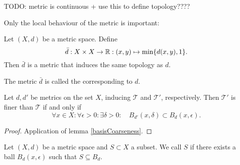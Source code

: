 TODO: metric is continuous + use this to define topology????


Only the local behaviour of the metric is important:
\begin{proposition}
Let $(X,d)$ be a metric space. Define
\[ \bar{d}:X\times X\to \mathbb{R}: (x,y)\mapsto \min\{d(x,y),1\}. \]
Then $\bar{d}$ is a metric that induces the same topology as $d$.
\end{proposition}
The metric $\bar{d}$ is called the  corresponding to $d$.

\begin{proposition} \label{ballsCoarseness}
Let $d,d'$ be metrics on the set $X$, inducing $\mathcal{T}$ and $\mathcal{T}'$, respectively. Then $\mathcal{T}'$ is finer than $\mathcal{T}$ \textup{if and only if}
\[ \forall x\in X:\forall \epsilon>0:\exists \delta>0:\quad B_{d'}(x,\delta)\subset B_d(x,\epsilon). \]
\end{proposition}
\begin{proof}
Application of lemma \ref{basisCoarseness}.
\end{proof}

\begin{definition}
Let $(X,d)$ be a metric space and $S\subset X$ a subset. We call $S$  if there exists a ball $B_d(x,\epsilon)$ such that $S\subseteq B_d$.
\end{definition}

